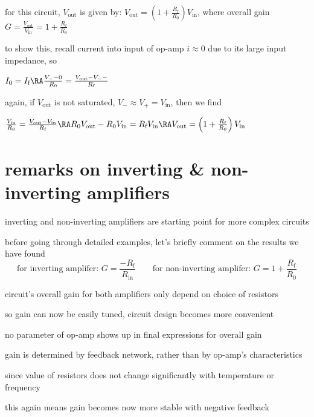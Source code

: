for this circuit, $V_\text{out}$ is given by: $\boxed{V_\text{out} = \left(1 + \frac{R_\text{f}}{R_0}\right)V_\text{in}}$, where overall gain $G=\frac{V_\text{out}}{V_\text{in}} = 1 + \frac{R_\text{f}}{R_0}$

to show this, recall current into input of op-amp $i\approx0$ due to its large input impedance, so

{

\centering
	
$I_\text{0} = I_\text{f} \RA \frac{V_- - 0}{R_0} = \frac{V_\text{out} - V_- -}{R_\text{f}}$

}


again, if $V_\text{out}$ is not saturated, $V_- \approx V_+ = V_\text{in}$, then we find


{
	
\centering

$\frac{V_\text{in}}{R_0} = \frac{V_\text{out} - V_\text{in}}{R_\text{f}} \RA  R_0 V_\text{out} - R_0 V_\text{in} = R_\text{f} V_\text{in}
\RA  V_\text{out} = \left(1 + \frac{R_\text{f}}{R_0}\right)V_\text{in}$
	
}

\section*{remarks on inverting \& non-inverting amplifiers}

inverting and non-inverting amplifiers are starting point for more complex circuits

before going through detailed examples, let's briefly comment on the results we have found
\begin{equation*}
	\text{for inverting amplifer: } G=\frac{-R_\text{f}}{R_\text{in}} \qquad \text{for non-inverting amplifer: } G=1+\frac{R_\text{f}}{R_0}
\end{equation*}

\cmt circuit's overall gain for both amplifiers only depend on choice of resistors

so gain can now be easily tuned, circuit design becomes more convenient

\cmt no parameter of op-amp shows up in final expressions for overall gain

gain is determined by feedback network, rather than by op-amp's characteristics
	
since value of resistors does not change significantly with temperature or frequency

this again means gain becomes now more stable with negative feedback
	
